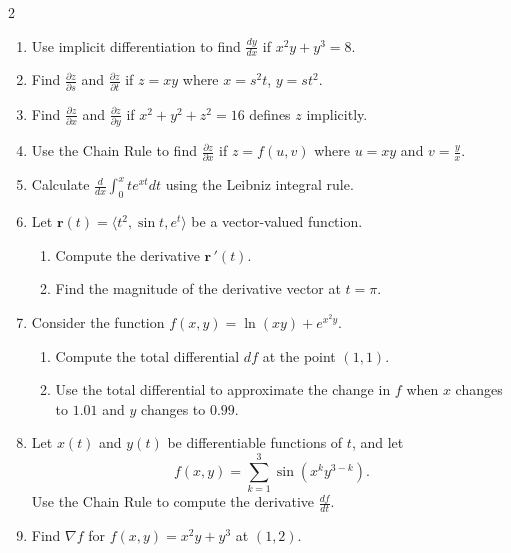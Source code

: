 \begin{multicols}{2}
\begin{enumerate}
    \item Use implicit differentiation to find $\frac{dy}{dx}$ if $x^2y + y^3 = 8$.
        
    \item Find $\frac{\partial z}{\partial s}$ and $\frac{\partial z}{\partial t}$ if $z = xy$ where $x = s^2t$, $y = st^2$.
        
    \item Find $\frac{\partial z}{\partial x}$ and $\frac{\partial z}{\partial y}$ if $x^2 + y^2 + z^2 = 16$ defines $z$ implicitly.
        
    \item Use the Chain Rule to find $\frac{\partial z}{\partial x}$ if $z = f(u,v)$ where $u = xy$ and $v = \frac{y}{x}$.
        
    \item Calculate $\frac{d}{dx}\int_0^x te^{xt}dt$ using the Leibniz integral rule.
        
    \item Let $\mathbf{r}(t) = \langle t^2, \sin t, e^t \rangle$ be a vector-valued function.
    \begin{enumerate}
        \item Compute the derivative $\mathbf{r}\,'(t)$.
        \item Find the magnitude of the derivative vector at $t = \pi$.
    \end{enumerate}
    
    \item Consider the function $f(x,y) = \ln(xy) + e^{x^2 y}$.
    \begin{enumerate}
        \item Compute the total differential $df$ at the point $(1, 1)$.
        \item Use the total differential to approximate the change in $f$ when $x$ changes to $1.01$ and $y$ changes to $0.99$.
    \end{enumerate}
    
    \item     Let \( x(t) \) and \( y(t) \) be differentiable functions of \( t \), and let
    \[
    f(x,y) = \sum_{k=1}^{3} \sin(x^k y^{3-k}).
    \]
   Use the Chain Rule to compute the derivative \( \frac{df}{dt} \).



    \item Find $\nabla f$ for $f(x,y) = x^2y + y^3$ at $(1,2)$.
    

\end{enumerate}
\end{multicols}
